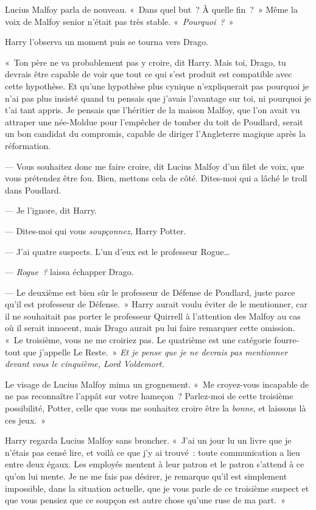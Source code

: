 Lucius Malfoy parla de nouveau.
«~Dans quel but~?
À quelle fin~?~»
Même la voix de Malfoy senior n'était pas très stable.
«~\emph{Pourquoi~?}~»

Harry l'observa un moment puis se tourna vers Drago.

«~Ton père ne va probablement pas y croire, dit Harry.
Mais toi, Drago, tu devrais être capable de voir que tout ce qui s'est produit est compatible avec cette hypothèse.
Et qu'une hypothèse plus cynique n'expliquerait pas pourquoi je n'ai pas plus insisté quand tu pensais que j'avais l'avantage sur toi, ni pourquoi je t'ai tant appris.
Je pensais que l'héritier de la maison Malfoy, que l'on avait vu attraper une née-Moldue pour l'empêcher de tomber du toit de Poudlard, serait un bon candidat du compromis, capable de diriger l'Angleterre magique après la réformation.

--- Vous souhaitez donc me faire croire, dit Lucius Malfoy d'un filet de voix, que vous prétendez être fou.
Bien, mettons cela de côté.
Dites-moi qui a lâché le troll dans Poudlard.

--- Je l'ignore, dit Harry.

--- Dites-moi qui vous \emph{soupçonnez}, Harry Potter.

--- J'ai quatre suspects.
L'un d'eux est le professeur Rogue…

--- \emph{Rogue~?} laissa échapper Drago.

--- Le deuxième est bien sûr le professeur de Défense de Poudlard, juste parce qu'il est professeur de Défense.~»
Harry aurait voulu éviter de le mentionner, car il ne souhaitait pas porter le professeur Quirrell à l'attention des Malfoy au cas où il serait innocent, mais Drago aurait pu lui faire remarquer cette omission.
«~Le troisième, vous ne me croiriez pas.
Le quatrième est une catégorie fourre-tout que j'appelle Le Reste.~»
\emph{Et je pense que je ne devrais pas mentionner devant vous le cinquième, Lord Voldemort.}

Le visage de Lucius Malfoy mima un grognement.
«~Me croyez-vous incapable de ne pas reconnaître l'appât sur votre hameçon~?
Parlez-moi de cette troisième possibilité, Potter, celle que vous me souhaitez croire être la \emph{bonne}, et laissons là ces jeux.~»

Harry regarda Lucius Malfoy sans broncher.
«~J'ai un jour lu un livre que je n'étais pas censé lire, et voilà ce que j'y ai trouvé~: toute communication a lieu entre deux égaux.
Les employés mentent à leur patron et le patron s'attend à ce qu'on lui mente.
Je ne me fais pas désirer, je remarque qu'il est simplement impossible, dans la situation actuelle, que je vous parle de ce troisième suspect et que vous pensiez que ce soupçon est autre chose qu'une ruse de ma part.~»

